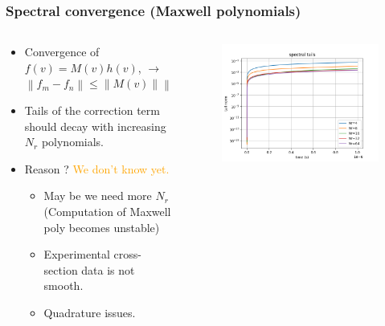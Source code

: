 \documentclass[mathserif, aspectratio=169]{beamer}
\newcommand{\norm}[1]{\left\lVert#1\right\rVert}
\begin{document}
	\begin{frame}
		\frametitle{Spectral convergence (Maxwell polynomials)}
		\begin{columns}
			\begin{column}{0.48\textwidth}
				\begin{itemize}
					\item Convergence of $f(v) = M(v) h(v)$,  $\rightarrow$ $\norm{f_{m}- f_{n}} \leq \norm{M(v)} \norm{h_m-h_n}$
					\item Tails of the correction term should decay with increasing $N_r$ polynomials.
					\item Reason ? \textcolor{orange}{We don't know yet.}
					\begin{itemize}
						\item May be we need more $N_r$ (Computation of Maxwell poly becomes unstable)
						\item Experimental cross-section data is not smooth. 
						\item Quadrature issues.
					\end{itemize}
				\end{itemize}
			\end{column}
			\begin{column}{0.48\textwidth}
				\begin{figure}
					\centering
					\includegraphics[width=\textwidth]{g0_mw_tails.png}
				\end{figure}
			\end{column}
		\end{columns}
	\end{frame}
\end{document}
